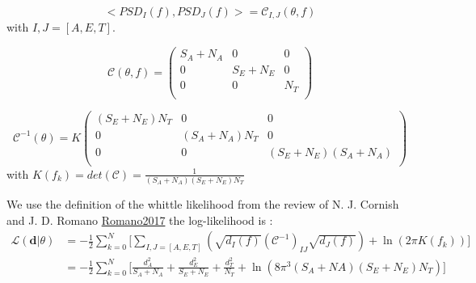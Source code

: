\documentclass[a4paper,12pt]{article}
\begin{document}
\begin{equation}
    <PSD_I(f),PSD_J(f)> = \mathcal{C}_{I,J}(\theta,f) 
\end{equation}
with $I,J = [A,E,T]$.

 \begin{equation}
     \mathcal{C}(\theta,f) =
     \left(
     \begin{array}{ccc}
      S_A + N_A & 0 & 0  \\
      0 & S_E + N_E & 0 \\
      0 & 0 & N_T\\
     \end{array}
     \right)
 \end{equation}
 
  \begin{equation}
     \mathcal{C}^{-1}(\theta) = K
     \left(
     \begin{array}{ccc}
      (S_E+N_E)N_T & 0 & 0  \\
      0 & (S_A+N_A)N_T & 0  \\
      0 & 0 & (S_E+N_E)(S_A + N_A) \\
     \end{array}
     \right)
 \end{equation}
 with $K(f_k) = det(\mathcal{C}) = \frac{1}{(S_A + N_A)(S_E + N_E)N_T}$ %
 
 We use the definition of the whittle likelihood from the review of N. J. Cornish and J. D. Romano \href{https://link.springer.com/content/pdf/10.1007/s41114-017-0004-1.pdf}{Romano2017} \cite{Romano2017} the log-likelihood is :
\begin{equation} 
\begin{split}
     \mathcal{L}(\textbf{d}|\theta) & =  -\frac{1}{2} \sum_{k=0}^N \Bigg[ \sum_{I,J = [A,E,T]} \left( \sqrt{d_I(f)} \left(\mathcal{C}^{-1}\right)_{IJ} \sqrt{d_J(f)} \right)  + \ln\left(2\pi K(f_k) \right) \Bigg] \\
    &=  -\frac{1}{2} \sum_{k=0}^N \Bigg[ \frac{d_A^2}{S_A+N_A}  + \frac{d_E^2}{S_E+N_E} + \frac{d_T^2}{N_T} +  \ln\left(8\pi^3 (S_A+NA)(S_E+N_E)N_T \right) \Bigg] 
\end{split}
\end{equation}
\end{document}
